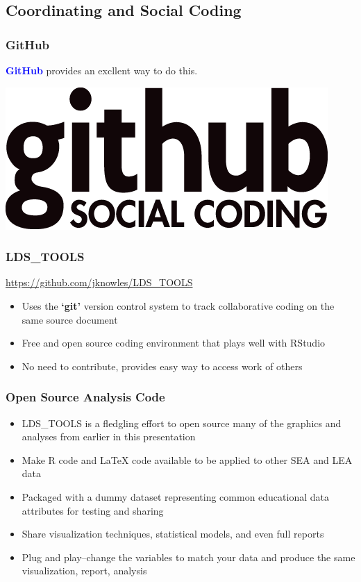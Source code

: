 \documentclass{beamer}
\begin{document}
\subsection{Coordinating and Social Coding}
\begin{frame}
\frametitle{GitHub}
\Large \textbf{\textcolor{blue}{GitHub}} \normalsize provides an excllent way to do this. 
\vspace{.5in}
\begin{center}
\includegraphics[width=.45\textwidth]{GitHublogo}
\end{center}
\end{frame}



\begin{frame}
\frametitle{LDS\_TOOLS}
\vspace{.18in}
\Large  \textcolor{blue}{\href{https://github.com/jknowles/LDS_TOOLS}{https://github.com/jknowles/LDS\_TOOLS}}
\begin{itemize}
  \item Uses the \textbf{`git'} version control system to track collaborative coding on the same source document
  \item Free and open source coding environment that plays well with RStudio
  \item No need to contribute, provides easy way to access work of others
\end{itemize}
\end{frame}

\begin{frame}
\frametitle{Open Source Analysis Code}
\begin{itemize}
  \item LDS\_TOOLS is a fledgling effort to open source many of the graphics and analyses from earlier in this presentation
  \item Make R code and \LaTeX{} code available to be applied to other SEA and LEA data
  \item Packaged with a dummy dataset representing common educational data attributes for testing and sharing 
  \item Share visualization techniques, statistical models, and even full reports
  \item Plug and play--change the variables to match your data and produce the same visualization, report, analysis
\end{itemize}
\end{frame}
\end{document}
